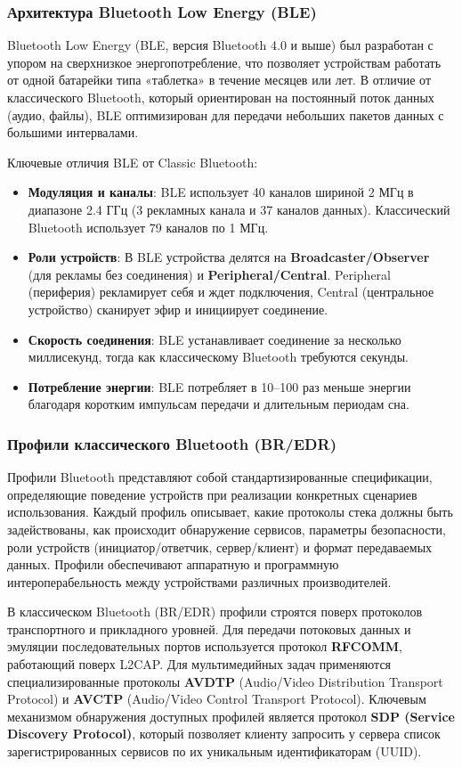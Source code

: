 \subsubsection{Архитектура Bluetooth Low Energy (BLE)}
Bluetooth Low Energy (BLE, версия Bluetooth 4.0 и выше) был разработан с упором на сверхнизкое энергопотребление, что позволяет устройствам работать от одной батарейки типа «таблетка» в течение месяцев или лет. В отличие от классического Bluetooth, который ориентирован на постоянный поток данных (аудио, файлы), BLE оптимизирован для передачи небольших пакетов данных с большими интервалами.

Ключевые отличия BLE от Classic Bluetooth:
\begin{itemize}[nosep]
    \item \textbf{Модуляция и каналы}: BLE использует 40 каналов шириной 2 МГц в диапазоне 2.4 ГГц (3 рекламных канала и 37 каналов данных). Классический Bluetooth использует 79 каналов по 1 МГц.
    \item \textbf{Роли устройств}: В BLE устройства делятся на \textbf{Broadcaster/Observer} (для рекламы без соединения) и \textbf{Peripheral/Central}. Peripheral (периферия) рекламирует себя и ждет подключения, Central (центральное устройство) сканирует эфир и инициирует соединение.
    \item \textbf{Скорость соединения}: BLE устанавливает соединение за несколько миллисекунд, тогда как классическому Bluetooth требуются секунды.
    \item \textbf{Потребление энергии}: BLE потребляет в 10–100 раз меньше энергии благодаря коротким импульсам передачи и длительным периодам сна.
\end{itemize}

\subsubsection{Профили классического Bluetooth (BR/EDR)}
Профили Bluetooth представляют собой стандартизированные спецификации, определяющие поведение устройств при реализации конкретных сценариев использования. Каждый профиль описывает, какие протоколы стека должны быть задействованы, как происходит обнаружение сервисов, параметры безопасности, роли устройств (инициатор/ответчик, сервер/клиент) и формат передаваемых данных. Профили обеспечивают аппаратную и программную интероперабельность между устройствами различных производителей.

В классическом Bluetooth (BR/EDR) профили строятся поверх протоколов транспортного и прикладного уровней. Для передачи потоковых данных и эмуляции последовательных портов используется протокол \textbf{RFCOMM}, работающий поверх L2CAP. Для мультимедийных задач применяются специализированные протоколы \textbf{AVDTP} (Audio/Video Distribution Transport Protocol) и \textbf{AVCTP} (Audio/Video Control Transport Protocol). Ключевым механизмом обнаружения доступных профилей является протокол \textbf{SDP (Service Discovery Protocol)}, который позволяет клиенту запросить у сервера список зарегистрированных сервисов по их уникальным идентификаторам (UUID).

